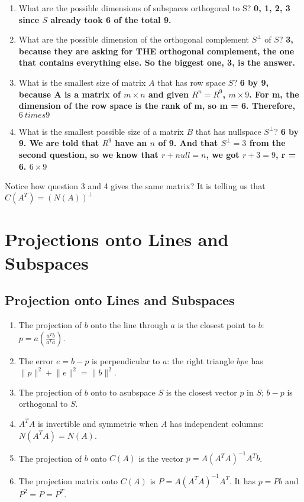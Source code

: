 \begin{enumerate}
    \item What are the possible dimensions of subspaces orthogonal to S? \textbf{0, 1, 2, 3 since \(S\) already took 6 of the total 9.}
    \item What are the possible dimension of the orthogonal complement \(S^{\perp}\) of \(S\)? \textbf{3, because they are asking for THE orthogonal complement, the one that contains everything else. So the biggest one, 3, is the answer. }
    \item What is the smallest size of matrix \(A\) that has row space \(S\)? \textbf{6 by 9, because A is a matrix of \(m \times n\) and given  \(R^n = R^9\), \(m \times 9\). For m, the dimension of the row space is the rank of m, so m = 6. Therefore, \(6 \ times 9\)  }
    \item What is the smallest possible size of a matrix \(B\) that has nullspace \(S^{\perp}\)? \textbf{6 by 9. We are told that \(R^9\) have an \(n\) of 9. And that \(S^{\perp} = 3\) from the second question, so we know that \(r + null = n \), we got \(r + 3 = 9\), r = 6. \(6 \times 9\)      }         
\end{enumerate} 

Notice how question 3 and 4 gives the same matrix? It is telling us that \(C(A^T) = (N(A))^{\perp} \)  


\section{Projections onto Lines and Subspaces}

\subsection{Projection onto Lines and Subspaces}
\begin{enumerate}
    \item The projection of \(b\) onto the line through \(a\) is the closest point to \(b\): \(p = a(\frac{a^{T}b}{a^{T}a})\). 
    \item The error \(e = b - p\) is perpendicular to \(a\): the right triangle \(b p e\) has \(\lVert p \rVert^2 + \lVert e \rVert^2 = \lVert b \rVert^2   \). 
    \item The projection of \(b\) onto to asubspace \(S\) is the closest vector \(p\) in \(S\); \(b - p\) is orthogonal to \(S\). 
    \item \(A^{T}A\) is invertible and symmetric when \(A\) has independent columns: \(N(A^{T}A)= N(A)\).                 
    \item The projection of \(b\) onto \(C(A)\) is the vector \(p = A(A^{T}A)^{-1}A^{T}b\).
    \item The projection matrix onto \(C(A)\) is \(P = A(A^{T}A)^{-1}A^T\). It has \(p = Pb\) and \(P^2 = P = P^T\).  
\end{enumerate}

